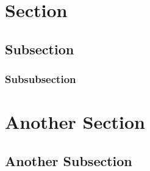 \documentclass[8pt]{scrartcl}
\begin{document}
\begin{multicols*}{3}

\section*{Section}

\blindmathpaper

\subsection*{Subsection}

\blindtext
\blinditemize[3]

\subsubsection*{Subsubsection}

\blindtext
\blindenumerate[3]

\section*{Another Section}

\blindtext[3]

\subsection*{Another Subsection}

\blindtext
\blinditemize[3]
\blindenumerate[3]

\end{multicols*}
\end{document}

